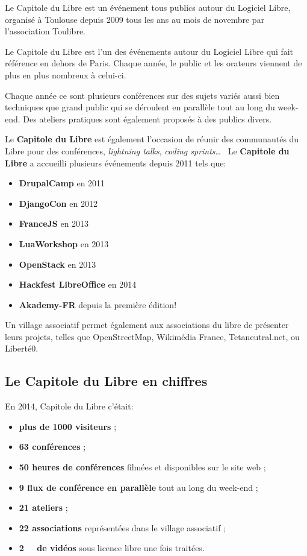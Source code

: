 
Le Capitole du Libre est un événement tous publics autour du Logiciel Libre,
 organisé à Toulouse depuis 2009 tous les ans au mois de novembre
 par l'association Toulibre.



Le Capitole du Libre est l'un des événements autour du Logiciel Libre
 qui fait référence en dehors de Paris.
 Chaque année, le public et les orateurs viennent de plus en plus nombreux
 à celui-ci.

Chaque année ce sont plusieurs conférences sur des sujets variés
 aussi bien techniques que grand public qui se déroulent en parallèle
 tout au long du week-end.
 Des ateliers pratiques sont également proposés à des publics divers.

\Separateur

Le \textbf{Capitole du Libre} est également l'occasion de réunir des 
communautés du Libre pour des conférences, \textit{lightning talks}, 
\textit{coding sprints}\dots ~ Le \textbf{Capitole du Libre} a 
accueilli plusieurs événements depuis 2011 tels que:
\begin{itemize}[label=$\bullet$]
\item \textbf{DrupalCamp} en 2011
\item \textbf{DjangoCon} en 2012
\item \textbf{FranceJS} en 2013
\item \textbf{LuaWorkshop} en 2013
\item \textbf{OpenStack} en 2013
\item \textbf{Hackfest LibreOffice}  en 2014
\item \textbf{Akademy-FR} depuis la première édition!
\end{itemize}

\Separateur

Un village associatif permet également aux associations du libre de
 présenter leurs projets, telles que OpenStreetMap, Wikimédia France, 
Tetaneutral.net, ou Liberté0.

\subsection{Le Capitole du Libre en chiffres}

En 2014, Capitole du Libre c'était:
\begin{itemize}[label=$\bullet$]
\item \textbf{plus de 1000 visiteurs} ;
\item \textbf{63 conférences} ;
\item \textbf{50 heures de conférences} filmées et disponibles sur le site web ;
\item \textbf{9 flux de conférence en parallèle} tout au long du week-end ;
\item \textbf{21 ateliers} ;
\item \textbf{22 associations} représentées dans le village associatif ;
\item \textbf{\SI{2}{\tebi\byte} de vidéos} sous licence libre une fois traitées.
\end{itemize}

